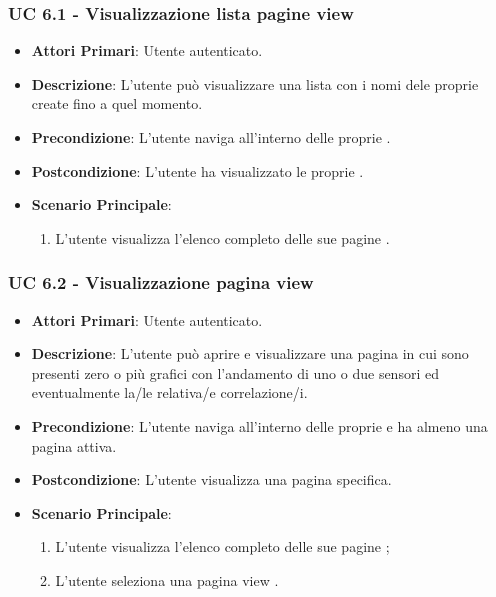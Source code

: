			\subsubsection{UC 6.1 - Visualizzazione lista pagine view}
			\begin{itemize}
				\item \textbf{Attori Primari}: Utente autenticato.
				\item \textbf{Descrizione}: L'utente può visualizzare una lista con i nomi dele proprie  create fino a quel momento.
				\item \textbf{Precondizione}: L'utente naviga all'interno delle proprie .
				\item \textbf{Postcondizione}: L'utente ha visualizzato le proprie .
				\item \textbf{Scenario Principale}:
				\begin{enumerate}
					\item{L'utente visualizza l'elenco completo delle sue pagine .}
				\end{enumerate}	
			\end{itemize}

			\subsubsection{UC 6.2 - Visualizzazione pagina view}
			\begin{itemize}
				\item \textbf{Attori Primari}: Utente autenticato.
				\item \textbf{Descrizione}: L'utente può aprire e visualizzare una pagina  in cui sono presenti zero o più grafici con l'andamento di uno o due sensori ed eventualmente la/le relativa/e correlazione/i.
				\item \textbf{Precondizione}: L'utente naviga all'interno delle proprie  e ha almeno una pagina  attiva.
				\item \textbf{Postcondizione}: L'utente visualizza una pagina  specifica.
				\item \textbf{Scenario Principale}:
				\begin{enumerate}
					\item{L'utente visualizza l'elenco completo delle sue pagine ;}
					\item{L'utente seleziona una pagina view .}
				\end{enumerate}	
			\end{itemize}

